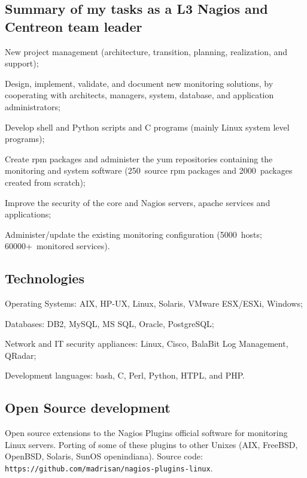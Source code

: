 \subsection{Summary of my tasks as a L3 Nagios and Centreon team leader}

\item{\bdot} New project management (architecture, transition, planning, 
   realization, and support);
\item{\bdot} Design, implement, validate, and document new monitoring solutions,
   by cooperating with architects, managers, system, database, and application 
   administrators;
\item{\bdot} Develop shell and Python scripts and C programs 
   (mainly Linux system level programs);
\item{\bdot} Create rpm packages and administer the yum repositories containing
   the monitoring and system software (250\smallplus~source rpm packages and
   2000~packages created from scratch);
\item{\bdot} Improve the security of the core and Nagios servers, apache 
   services and applications;
\item{\bdot} Administer/update the existing monitoring configuration 
   (5000\smallplus~hosts; 60000+~monitored services).

\subsection{Technologies}

\item{\bdot} Operating Systems: AIX, HP-UX, Linux, Solaris, VMware ESX/ESXi, Windows;
\item{\bdot} Databases: DB2, MySQL, MS SQL, Oracle, PostgreSQL;
\item{\bdot} Network and IT security appliances: Linux, Cisco, BalaBit Log Management, 
   QRadar;
\item{\bdot} Development languages: bash, C, Perl, Python, HTPL, and PHP.

\subsection{Open Source development}

Open source extensions to the Nagios Plugins official software for monitoring
Linux servers.
Porting of some of these plugins to other Unixes
(AIX, FreeBSD, OpenBSD, Solaris, SunOS openindiana).
Source code:
{\tt https://github.com/madrisan/nagios-plugins-linux}.

